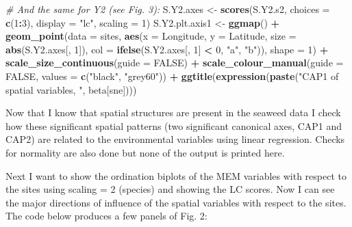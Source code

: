 \documentclass[10pt,A4,]{article}
\newenvironment{Shaded}{\begin{snugshade}}{\end{snugshade}}
\newcommand{\KeywordTok}[1]{\textcolor[rgb]{0.13,0.29,0.53}{\textbf{#1}}}
\newcommand{\DataTypeTok}[1]{\textcolor[rgb]{0.13,0.29,0.53}{#1}}
\newcommand{\DecValTok}[1]{\textcolor[rgb]{0.00,0.00,0.81}{#1}}
\newcommand{\StringTok}[1]{\textcolor[rgb]{0.31,0.60,0.02}{#1}}
\newcommand{\CommentTok}[1]{\textcolor[rgb]{0.56,0.35,0.01}{\textit{#1}}}
\newcommand{\OtherTok}[1]{\textcolor[rgb]{0.56,0.35,0.01}{#1}}
\newcommand{\OperatorTok}[1]{\textcolor[rgb]{0.81,0.36,0.00}{\textbf{#1}}}
\newcommand{\NormalTok}[1]{#1}
\begin{document}
\begin{Shaded}
\begin{Highlighting}[]
\CommentTok{# And the same for Y2 (see Fig. 3):}
\NormalTok{S.Y2.axes <-}\StringTok{ }\KeywordTok{scores}\NormalTok{(S.Y2.s2, }\DataTypeTok{choices =} \KeywordTok{c}\NormalTok{(}\DecValTok{1}\OperatorTok{:}\DecValTok{3}\NormalTok{), }\DataTypeTok{display =} \StringTok{"lc"}\NormalTok{, }\DataTypeTok{scaling =} \DecValTok{1}\NormalTok{)}
\NormalTok{S.Y2.plt.axis1 <-}\StringTok{ }\KeywordTok{ggmap}\NormalTok{() }\OperatorTok{+}
\StringTok{  }\KeywordTok{geom_point}\NormalTok{(}\DataTypeTok{data =}\NormalTok{ sites, }\KeywordTok{aes}\NormalTok{(}\DataTypeTok{x =}\NormalTok{ Longitude, }\DataTypeTok{y =}\NormalTok{ Latitude,}
                               \DataTypeTok{size =} \KeywordTok{abs}\NormalTok{(S.Y2.axes[, }\DecValTok{1}\NormalTok{]),}
                               \DataTypeTok{col =} \KeywordTok{ifelse}\NormalTok{(S.Y2.axes[, }\DecValTok{1}\NormalTok{] }\OperatorTok{<}\StringTok{ }\DecValTok{0}\NormalTok{, }\StringTok{"a"}\NormalTok{, }\StringTok{"b"}\NormalTok{)), }\DataTypeTok{shape =} \DecValTok{1}\NormalTok{) }\OperatorTok{+}
\StringTok{  }\KeywordTok{scale_size_continuous}\NormalTok{(}\DataTypeTok{guide =} \OtherTok{FALSE}\NormalTok{) }\OperatorTok{+}
\StringTok{  }\KeywordTok{scale_colour_manual}\NormalTok{(}\DataTypeTok{guide =} \OtherTok{FALSE}\NormalTok{, }\DataTypeTok{values =} \KeywordTok{c}\NormalTok{(}\StringTok{"black"}\NormalTok{, }\StringTok{"grey60"}\NormalTok{)) }\OperatorTok{+}
\StringTok{  }\KeywordTok{ggtitle}\NormalTok{(}\KeywordTok{expression}\NormalTok{(}\KeywordTok{paste}\NormalTok{(}\StringTok{"CAP1 of spatial variables, "}\NormalTok{, beta[sne])))}
\end{Highlighting}
\end{Shaded}

Now that I know that spatial structures are present in the seaweed data
I check how these significant spatial patterns (two significant
canonical axes, CAP1 and CAP2) are related to the environmental
variables using linear regression. Checks for normality are also done
but none of the output is printed here.

Next I want to show the ordination biplots of the MEM variables with
respect to the sites using scaling = 2 (species) and showing the LC
scores. Now I can see the major directions of influence of the spatial
variables with respect to the sites. The code below produces a few
panels of Fig. 2:
\end{document}
